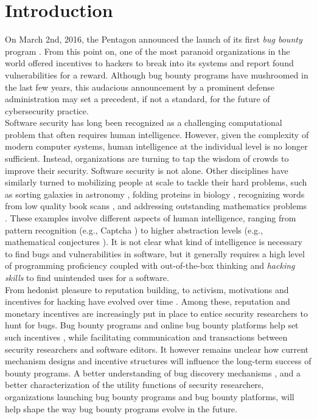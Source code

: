 \section{Introduction}
\label{sec:intro}
On March 2nd, 2016, the Pentagon announced the launch of its first {\it bug bounty} program \cite{Pentagon}. From this point on, one of the most paranoid organizations in the world offered incentives to hackers to break into its systems and report found vulnerabilities for a reward. Although bug bounty programs have mushroomed in the last few years, this audacious announcement by a prominent defense administration may set a precedent, if not a standard, for the future of cybersecurity practice.\\ 

Software security has long been recognized as a challenging computational problem \cite{adams1984textordfeminineoptimizing} that often requires human intelligence. However, given the complexity of modern computer systems, human intelligence at the individual level is no longer sufficient. Instead, organizations are turning to tap the wisdom of crowds \cite{surowiecki2005wisdom} to improve their security. Software security is not alone. Other disciplines have similarly turned to mobilizing people at scale to tackle their hard problems, such as sorting galaxies in astronomy \cite{smith2013introduction}, folding proteins in biology \cite{khatib2011algorithm}, recognizing words from low quality book scans \cite{von2003captcha}, and addressing outstanding mathematics problems \cite{gowers2009massively,cranshaw2011polymath}. These examples involve different aspects of human intelligence, ranging from pattern recognition (e.g., Captcha \cite{von2003captcha}) to higher abstraction levels (e.g., mathematical conjectures \cite{gowers2009massively,cranshaw2011polymath}). It is not clear what kind of intelligence is necessary to find bugs and vulnerabilities in software, but it generally requires a high level of programming proficiency coupled with out-of-the-box thinking and {\it hacking skills} to find unintended uses for a software. \\

From hedonist pleasure to reputation building, to activism, motivations and incentives for hacking have evolved over time \cite{Levy84}. Among these, reputation and monetary incentives are increasingly put in place to entice security researchers to hunt for bugs. Bug bounty programs and online bug bounty platforms help set such incentives \cite{bohme2006comparison,finifter2013empirical,zhao2014exploratory,zhao2015empirical}, while facilitating communication and transactions between security researchers and software editors. It however remains unclear how current mechanism designs and incentive structures will influence the long-term success of bounty programs. A better understanding of bug discovery mechanisms \cite{bishop1996conservative,brady1999murphy,zhao2016empirical}, and a better characterization of the utility functions of security researchers, organizations launching bug bounty programs and bug bounty platforms, will help shape the way bug bounty programs evolve in the future.\\

